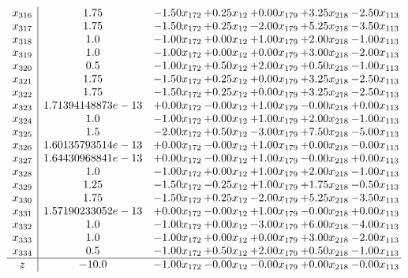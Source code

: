 \documentclass[8pt]{article}
\begin{document}
\[\begin{array}{c| c c@{\hskip 2pt} c@{\hskip 2pt} c@{\hskip 2pt} c@{\hskip 2pt} c@{\hskip 2pt} }
 x_{316}   &  1.75 & -1.50 x_{172} & +  0.25 x_{12} & +  0.00 x_{179} & +  3.25 x_{218} & -2.50 x_{113}\\
 x_{317}   &  1.75 & -1.50 x_{172} & +  0.25 x_{12} & -2.00 x_{179} & +  5.25 x_{218} & -3.50 x_{113}\\
 x_{318}   &  1.0 & -1.00 x_{172} & +  0.00 x_{12} & +  1.00 x_{179} & +  2.00 x_{218} & -1.00 x_{113}\\
 x_{319}   &  1.0 & -1.00 x_{172} & +  0.00 x_{12} & +  0.00 x_{179} & +  3.00 x_{218} & -2.00 x_{113}\\
 x_{320}   &  0.5 & -1.00 x_{172} & +  0.50 x_{12} & +  2.00 x_{179} & +  0.50 x_{218} & -1.00 x_{113}\\
 x_{321}   &  1.75 & -1.50 x_{172} & +  0.25 x_{12} & +  0.00 x_{179} & +  3.25 x_{218} & -2.50 x_{113}\\
 x_{322}   &  1.75 & -1.50 x_{172} & +  0.25 x_{12} & +  0.00 x_{179} & +  3.25 x_{218} & -2.50 x_{113}\\
 x_{323}   &  1.71394148873e-13 & +  0.00 x_{172} & -0.00 x_{12} & +  1.00 x_{179} & -0.00 x_{218} & +  0.00 x_{113}\\
 x_{324}   &  1.0 & -1.00 x_{172} & +  0.00 x_{12} & +  1.00 x_{179} & +  2.00 x_{218} & -1.00 x_{113}\\
 x_{325}   &  1.5 & -2.00 x_{172} & +  0.50 x_{12} & -3.00 x_{179} & +  7.50 x_{218} & -5.00 x_{113}\\
 x_{326}   &  1.60135793514e-13 & +  0.00 x_{172} & -0.00 x_{12} & +  1.00 x_{179} & +  0.00 x_{218} & -0.00 x_{113}\\
 x_{327}   &  1.64430968841e-13 & +  0.00 x_{172} & -0.00 x_{12} & +  1.00 x_{179} & -0.00 x_{218} & +  0.00 x_{113}\\
 x_{328}   &  1.0 & -1.00 x_{172} & +  0.00 x_{12} & +  1.00 x_{179} & +  2.00 x_{218} & -1.00 x_{113}\\
 x_{329}   &  1.25 & -1.50 x_{172} & -0.25 x_{12} & +  1.00 x_{179} & +  1.75 x_{218} & -0.50 x_{113}\\
 x_{330}   &  1.75 & -1.50 x_{172} & +  0.25 x_{12} & -2.00 x_{179} & +  5.25 x_{218} & -3.50 x_{113}\\
 x_{331}   &  1.57190233052e-13 & +  0.00 x_{172} & -0.00 x_{12} & +  1.00 x_{179} & -0.00 x_{218} & +  0.00 x_{113}\\
 x_{332}   &  1.0 & -1.00 x_{172} & +  0.00 x_{12} & -3.00 x_{179} & +  6.00 x_{218} & -4.00 x_{113}\\
 x_{333}   &  1.0 & -1.00 x_{172} & +  0.00 x_{12} & +  0.00 x_{179} & +  3.00 x_{218} & -2.00 x_{113}\\
 x_{334}   &  0.5 & -1.00 x_{172} & +  0.50 x_{12} & +  2.00 x_{179} & +  0.50 x_{218} & -1.00 x_{113}\\
\hline
z    &  -10.0 & -1.00 x_{172} & -0.00 x_{12} & -0.00 x_{179} & +  0.00 x_{218} & -0.00 x_{113}\\
\end{array}\]
\end{document}
